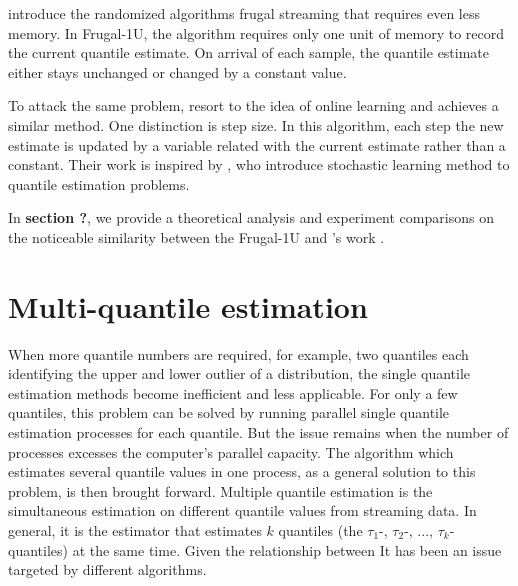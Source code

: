 \citeauthor{maFrugalStreamingEstimating2014}\cite{maFrugalStreamingEstimating2014} introduce the randomized algorithms frugal streaming that requires even less memory.
In Frugal-1U, the algorithm requires only one unit of memory to record the current quantile estimate. On arrival of each sample, the quantile estimate either stays unchanged or changed by a constant value. 

To attack the same problem, \citeauthor{yazidiQuantileEstimationDynamic2016}\cite{yazidiQuantileEstimationDynamic2016} resort to the idea of online learning and achieves a similar method. 
One distinction is step size. In this algorithm, each step the new estimate is updated by a variable related with the current estimate rather than a constant.
Their work is inspired by \citeauthor{tierneySpaceEfficientRecursiveProcedure1983}\cite{tierneySpaceEfficientRecursiveProcedure1983}, who introduce stochastic learning method to quantile estimation problems. 

In \textbf{section ?}, we provide a theoretical analysis and experiment comparisons on the noticeable similarity between the Frugal-1U and \citeauthor{yazidiQuantileEstimationDynamic2016}'s work . 


\pagebreak 


\section{Multi-quantile estimation}
\label{multiquantile}
When more quantile numbers are required, for example, two quantiles each identifying the upper and lower outlier of a distribution, the single quantile estimation methods become inefficient and less applicable.
For only a few quantiles, this problem can be solved by running parallel single quantile estimation processes for each quantile. But the issue remains when the number of processes excesses the computer's parallel capacity.
The algorithm which estimates several quantile values in one process, as a general solution to this problem, is then brought forward.
Multiple quantile estimation is the simultaneous estimation on different quantile values from streaming data. 
In general, it is the estimator that estimates $k$ quantiles (the $\tau_1$-, $\tau_2$-, $...$, $\tau_k$-quantiles) at the same time.
Given the relationship between 
It has been an issue targeted by different algorithms.
